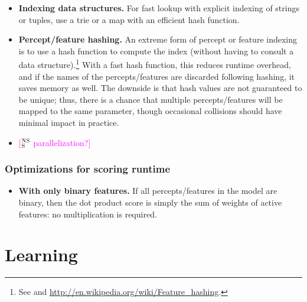 \documentclass[11pt,letterpaper]{article}
\newcommand{\ensuretext}[1]{#1}
\newcommand{\nssmarker}{\ensuretext{\textcolor{magenta}{\ensuremath{^{\textsc{NS}}_{\textsc{S}}}}}}
\newcommand{\arkcomment}[3]{\ensuretext{\textcolor{#3}{[#1 #2]}}}
\newcommand{\nss}[1]{\arkcomment{\nssmarker}{#1}{magenta}}
\begin{document}
\begin{itemize}
  \item \textbf{Indexing data structures.} For fast lookup with explicit indexing of strings or tuples, 
use a trie or a map with an efficient hash function.

  \item \textbf{Percept/feature hashing.} An extreme form of percept or feature indexing is to use a hash function to compute the index 
(without having to consult a data structure).\footnote{See \citep{weinberger-09} and \url{http://en.wikipedia.org/wiki/Feature_hashing}.}
With a fast hash function, this reduces runtime overhead, 
and if the names of the percepts\slash features are discarded following hashing, it saves memory as well.
The downside is that hash values are not guaranteed to be unique; 
thus, there is a chance that multiple percepts\slash features will 
be mapped to the same parameter, though occasional collisions should have minimal impact in practice. 

  \item \nss{parallelization?}
\end{itemize}

\subsubsection{Optimizations for scoring runtime}

\begin{itemize}
\item \textbf{With only binary features.} If all percepts\slash features in the model are binary, 
then the dot product score is simply the sum of weights of active features: no multiplication is required.
\end{itemize}



\section{Learning}\label{sec:learning}
\end{document}
